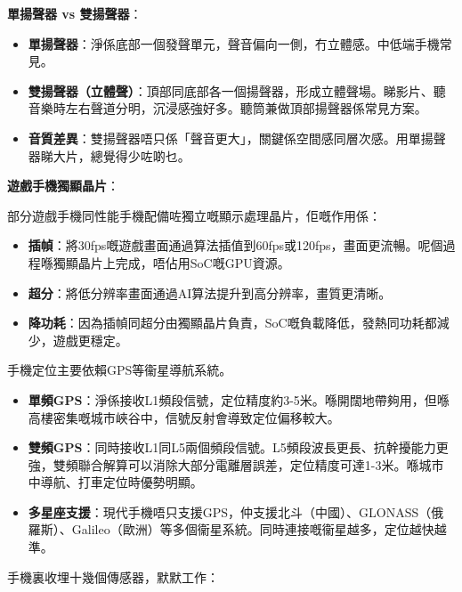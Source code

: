 \textbf{單揚聲器 vs 雙揚聲器}：

\begin{itemize}
  \item \textbf{單揚聲器}：淨係底部一個發聲單元，聲音偏向一側，冇立體感。中低端手機常見。
  \item \textbf{雙揚聲器（立體聲）}：頂部同底部各一個揚聲器，形成立體聲場。睇影片、聽音樂時左右聲道分明，沉浸感強好多。聽筒兼做頂部揚聲器係常見方案。
  \item \textbf{音質差異}：雙揚聲器唔只係「聲音更大」，關鍵係空間感同層次感。用單揚聲器睇大片，總覺得少咗啲乜。
\end{itemize}

\textbf{遊戲手機獨顯晶片}：

部分遊戲手機同性能手機配備咗獨立嘅顯示處理晶片，佢嘅作用係：

\begin{itemize}
  \item \textbf{插幀}：將30fps嘅遊戲畫面通過算法插值到60fps或120fps，畫面更流暢。呢個過程喺獨顯晶片上完成，唔佔用SoC嘅GPU資源。
  \item \textbf{超分}：將低分辨率畫面通過AI算法提升到高分辨率，畫質更清晰。
  \item \textbf{降功耗}：因為插幀同超分由獨顯晶片負責，SoC嘅負載降低，發熱同功耗都減少，遊戲更穩定。
\end{itemize}


手機定位主要依賴GPS等衞星導航系統。

\begin{itemize}
  \item \textbf{單頻GPS}：淨係接收L1頻段信號，定位精度約3-5米。喺開闊地帶夠用，但喺高樓密集嘅城市峽谷中，信號反射會導致定位偏移較大。
  \item \textbf{雙頻GPS}：同時接收L1同L5兩個頻段信號。L5頻段波長更長、抗幹擾能力更強，雙頻聯合解算可以消除大部分電離層誤差，定位精度可達1-3米。喺城市中導航、打車定位時優勢明顯。
  \item \textbf{多星座支援}：現代手機唔只支援GPS，仲支援北斗（中國）、GLONASS（俄羅斯）、Galileo（歐洲）等多個衞星系統。同時連接嘅衞星越多，定位越快越準。
\end{itemize}


手機裏收埋十幾個傳感器，默默工作：

